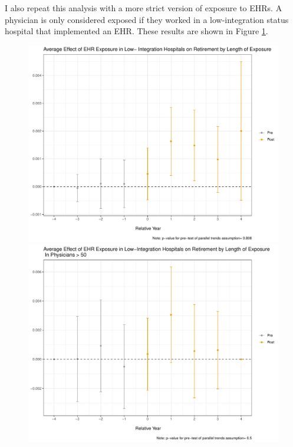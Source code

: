 \documentclass[11pt]{article}
\begin{document}
I also repeat this analysis with a more strict version of exposure to EHRs. A physician is only considered exposed if they worked in a low-integration status hospital that implemented an EHR. These results are shown in Figure \ref{fig:retiresecond}. 

\begin{figure}[ht]
\caption{}
        \begin{minipage}[b]{0.47\linewidth}
            \centering
            \includegraphics[width=\textwidth]{Objects/ggdid_retire_allEHR_li.pdf}
        \end{minipage}
        \hspace{0.2cm}
        \begin{minipage}[b]{0.47\linewidth}
            \centering
            \includegraphics[width=\textwidth]{Objects/ggdid_retire_allEHR_old_li.pdf}
        \end{minipage}
        \label{fig:retiresecond}
\end{figure}
\end{document}
